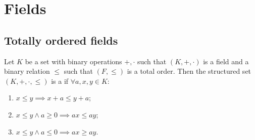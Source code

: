 \section{Fields}
\subsection{Totally ordered fields}
\begin{definition}
Let $K$ be a set with binary operations $+,\cdot$ such that $(K,+,\cdot)$ is a field and a binary relation $\leq$ such that $(F,\leq)$ is a total order. Then the structured set $(K,+,\cdot,\leq)$ is a  if $\forall a,x,y\in K$:
\begin{enumerate}
\item $x\leq y \implies x+a \leq y+a$;
\item $x\leq y \land a\geq 0 \implies ax \leq ay$;
\item $x\leq y \land a\leq 0 \implies ax \geq ay$.
\end{enumerate}
\end{definition}

